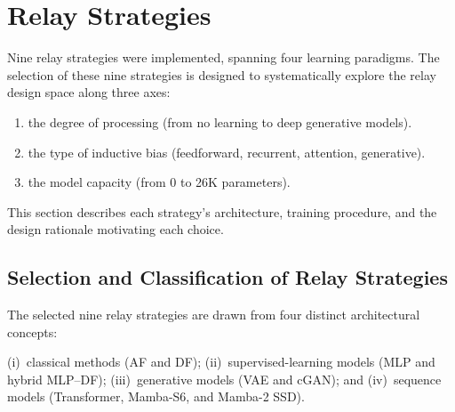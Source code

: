 \section{Relay Strategies}\label{sec:relay-strategies}

Nine relay strategies were implemented, spanning four learning paradigms. The selection of these nine strategies is designed to systematically explore the relay design space along three axes:
\begin{enumerate}
    \item  the degree of processing (from no learning to deep generative models).
    \item the type of inductive bias (feedforward, recurrent, attention, generative).
    \item the model capacity (from 0 to 26K parameters). 
\end{enumerate}
This section describes each strategy's architecture, training procedure, and the design rationale motivating each choice.

\subsection{Selection and Classification of Relay Strategies}

The selected nine relay strategies are drawn from four distinct architectural concepts:

(i)~classical methods (AF and DF); (ii)~supervised-learning models
(MLP and hybrid MLP--DF); (iii)~generative models (VAE and cGAN); and
(iv)~sequence models (Transformer, Mamba-S6, and Mamba-2 SSD).

